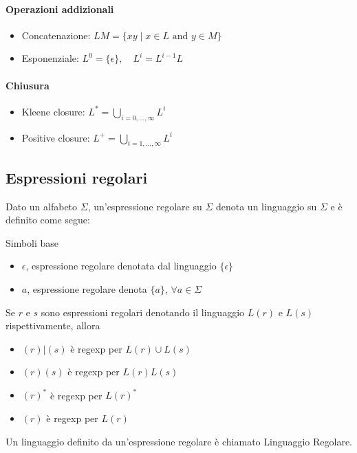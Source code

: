 \paragraph{Operazioni addizionali}
\begin{itemize}
\item Concatenazione: $LM = \{xy \mid x \in L \text{ and } y \in M\}$
\item Esponenziale: $L^0 = \{\epsilon\}, \quad L^i = L^{i-1}L$
\end{itemize}
\paragraph{Chiusura}
\begin{itemize}
\item Kleene closure: $L^* = \bigcup_{i=0,\ldots,\infty}L^i$
\item Positive closure: $L^+ = \bigcup_{i=1,\ldots,\infty}L^i$
\end{itemize}

\subsection{Espressioni regolari}
\begin{definition}
Dato un alfabeto $\Sigma$, un'espressione regolare su $\Sigma$ denota un
linguaggio su $\Sigma$ e è definito come segue:

Simboli base
\begin{itemize}
\item $\epsilon$, espressione regolare denotata dal linguaggio $\{\epsilon\}$
\item $a$, espressione regolare denota $\{a\}$, $\forall a \in \Sigma$
\end{itemize}

Se $r$ e $s$ sono espressioni regolari denotando il linguaggio $L(r)$ e $L(s)$
rispettivamente, allora
\begin{itemize}
\item $(r)|(s)$ è regexp per $L(r) \cup L(s)$
\item $(r)(s)$ è regexp per $L(r)L(s)$
\item $(r)^*$ è regexp per $L(r)^*$
\item $(r)$ è regexp per $L(r)$
\end{itemize}

Un linguaggio definito da un'espressione regolare è chiamato Linguaggio Regolare.
\end{definition}

